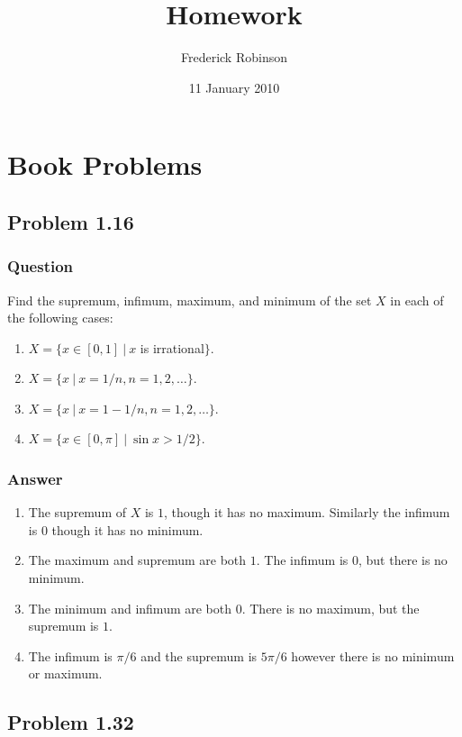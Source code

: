 \documentclass[12pt]{article}
\title{Homework}
\author{Frederick Robinson}
\date{11 January 2010}
\begin{document}

   \maketitle

\setcounter{tocdepth}{2} 

\tableofcontents

\section{Book Problems}

\subsection{Problem 1.16}
\subsubsection{Question}
Find the supremum, infimum, maximum, and minimum of the set $X$ in each of the following cases:
\begin{enumerate}
  \item $X=\{x \in [0,1] \ |\ x$ is irrational$\}$.
  \item $X = \{x\ |\ x=1/n, n=1,2,\dots\}$.
  \item $X = \{x\ |\ x=1-1/n, n=1,2,\dots\}$.
  \item $X= \{x \in [0,\pi]\ |\ \sin{x} > 1/2\}$.
\end{enumerate}
\subsubsection{Answer}
\begin{enumerate}
\item The supremum of $X$ is $1$, though it has no maximum. Similarly the infimum is $0$ though it has no minimum.
\item The maximum and supremum are both $1$. The infimum is $0$, but there is no minimum.
\item The minimum and infimum are both $0$. There is no maximum, but the supremum is $1$.
\item The infimum is $\pi/6$ and the supremum is $5 \pi / 6$ however there is no minimum or maximum.
\end{enumerate}
\subsection{Problem 1.32}
\end{document}
